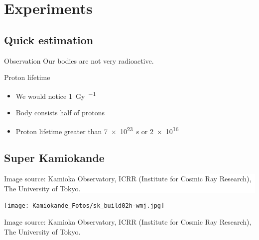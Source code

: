 \documentclass[english, fleqn]{beamer}
\begin{document}
\section{Experiments}

\subsection{Quick estimation}

\begin{frame}
    \begin{block}{Observation}
        Our bodies are not very radioactive.
    \end{block}

    \pause

    \begin{block}{Proton lifetime}
        \begin{itemize}
            \item We would notice \SI{1}{\gray\per\year}
            \item Body consists half of protons
            \item Proton lifetime greater than \SI{7e23}{\second} or \SI{2e16}{\year}
        \end{itemize}
    \end{block}

    \nocite{wikipedia/groessenordnung-aequivalentdosis}
\end{frame}

\subsection{Super Kamiokande}


{
    \begin{frame}

        \vspace{35ex}

        \colorbox{white}{%
            \begin{minipage}{.6\linewidth}
                \footnotesize
                Image source:
                Kamioka Observatory, ICRR (Institute for Cosmic Ray Research),
                The University of Tokyo.
                \parencite{super-k/images}
            \end{minipage}
        }
    \end{frame}
}

\begin{frame}
    {
        \centering
        \texttt{[image: Kamiokande\_Fotos/sk\_build02h-wmj.jpg]}
    }

    {
        \footnotesize
        Image source:
        Kamioka Observatory, ICRR (Institute for Cosmic Ray Research),
        The University of Tokyo.
        \parencite{super-k/images}
    }
\end{frame}
\end{document}
